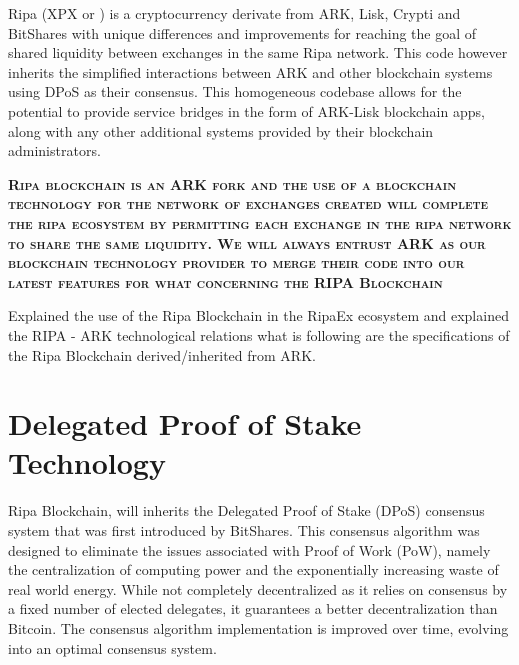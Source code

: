 \documentclass[11pt,fleqn]{book} %
\begin{document}
Ripa (XPX or \PHP) is a cryptocurrency derivate from ARK, Lisk, Crypti and BitShares with unique differences and improvements
for reaching the goal of shared liquidity between exchanges in the same Ripa network. This code however inherits the 
simplified interactions between ARK and other blockchain systems using DPoS as their consensus. This homogeneous codebase
allows for the potential to provide service bridges in the form of ARK-Lisk blockchain apps, along with any other additional 
systems provided by their blockchain administrators.

\vspace{5mm}
\textsc{\textbf{Ripa blockchain is an ARK fork and the use of a blockchain technology for the network of exchanges created will complete
the ripa ecosystem by permitting each exchange in the ripa network to share the same liquidity. We will always entrust ARK as our 
blockchain technology provider to merge their code into our latest features for what concerning the RIPA Blockchain}}

\vspace{5mm}

Explained the use of the Ripa Blockchain in the RipaEx ecosystem and explained the RIPA - ARK technological relations what is 
following are the specifications of the Ripa Blockchain derived/inherited from ARK.

\section{Delegated Proof of Stake Technology}
Ripa Blockchain, will inherits the Delegated Proof of Stake (DPoS) consensus system that was first introduced
by BitShares. This consensus algorithm was designed to eliminate the issues associated with Proof of Work (PoW), 
namely the centralization of computing power and the exponentially increasing waste of real world energy. While not
completely decentralized as it relies on consensus by a fixed number of elected delegates, it guarantees a better decentralization 
than Bitcoin. The consensus algorithm implementation is improved over time, evolving into an optimal consensus system.\\
\end{document}
